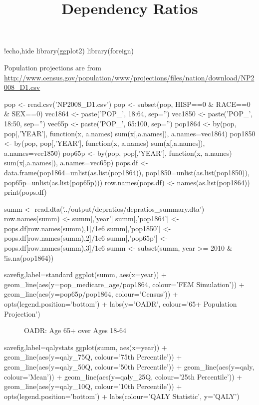 \documentclass{article}
\title{Dependency Ratios}
\begin{document}
\maketitle
\listoftables
\listoffigures

\begin{Rcode}{!echo,hide}
library(ggplot2)
library(foreign)
\end{Rcode}

Population projections are from \url{http://www.census.gov/population/www/projections/files/nation/download/NP2008_D1.csv}

\begin{Rcode}
pop <- read.csv('NP2008_D1.csv')
pop <- subset(pop, HISP==0 & RACE==0 & SEX==0)
vec1864 <- paste('POP_', 18:64, sep='')
vec1850 <- paste('POP_', 18:50, sep='')
vec65p <- paste('POP_', 65:100, sep='')
pop1864 <- by(pop, pop[,'YEAR'], function(x, a.names) sum(x[,a.names]), a.names=vec1864)
pop1850 <- by(pop, pop[,'YEAR'], function(x, a.names) sum(x[,a.names]), a.names=vec1850)
pop65p <- by(pop, pop[,'YEAR'], function(x, a.names) sum(x[,a.names]), a.names=vec65p)
pops.df <- data.frame(pop1864=unlist(as.list(pop1864)), pop1850=unlist(as.list(pop1850)), pop65p=unlist(as.list(pop65p)))
row.names(pops.df) <- names(as.list(pop1864))
print(pops.df)
\end{Rcode}

\begin{Rcode}
summ <- read.dta('../output/depratios/depratios_summary.dta')
row.names(summ) <- summ[,'year']
summ[,'pop1864'] <- pops.df[row.names(summ),1]/1e6
summ[,'pop1850'] <- pops.df[row.names(summ),2]/1e6
summ[,'pop65p'] <- pops.df[row.names(summ),3]/1e6
summ <- subset(summ, year >= 2010 & !is.na(pop1864))
\end{Rcode}

\begin{Rcode}{savefig,label=standard}
ggplot(summ, aes(x=year)) + 
geom_line(aes(y=pop_medicare_age/pop1864, colour='FEM Simulation')) + 
geom_line(aes(y=pop65p/pop1864, colour='Census')) +
opts(legend.position='bottom') + labs(y='OADR', colour='65+ Population Projection')
\end{Rcode}

\begin{figure}[ht]
\centering
{}
\caption{OADR: Age 65+ over Ages 18-64}
\end{figure}

\begin{Rcode}{savefig,label=qalystats}
ggplot(summ, aes(x=year)) + 
geom_line(aes(y=qaly_75Q, colour='75th Percentile')) + 
geom_line(aes(y=qaly_50Q, colour='50th Percentile')) + 
geom_line(aes(y=qaly, colour='Mean')) +
geom_line(aes(y=qaly_25Q, colour='25th Percentile')) + 
geom_line(aes(y=qaly_10Q, colour='10th Percentile')) + 
opts(legend.position='bottom') + labs(colour='QALY Statistic', y='QALY')
\end{Rcode}
\end{document}
